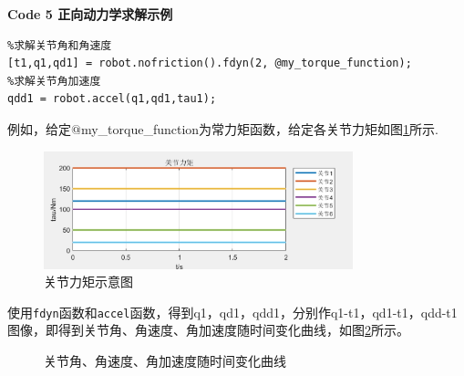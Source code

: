 \documentclass[12pt]{ctexart}
\begin{document}
\textbf{Code 5 \quad 正向动力学求解示例}
\begin{lstlisting}
%求解关节角和角速度
[t1,q1,qd1] = robot.nofriction().fdyn(2, @my_torque_function);   
%求解关节角加速度
qdd1 = robot.accel(q1,qd1,tau1);        
\end{lstlisting}

例如，给定$@$my\_torque\_function为常力矩函数，给定各关节力矩如图\ref{fig:torque}所示.

\begin{figure}[htbp]
    \centering
    \includegraphics[width=0.8\textwidth]{Image/fig51.png}
    \caption{关节力矩示意图}
    \label{fig:torque}
\end{figure}

使用\verb|fdyn|函数和\verb|accel|函数，得到q1，qd1，qdd1，分别作q1-t1，qd1-t1，qdd-t1图像，即得到关节角、角速度、角加速度随时间变化曲线，如图\ref{fig:q1qd1qdd1}所示。

\begin{figure}[htbp]
    \centering
    \caption{关节角、角速度、角加速度随时间变化曲线}
    \label{fig:q1qd1qdd1}
\end{figure}
\end{document}
